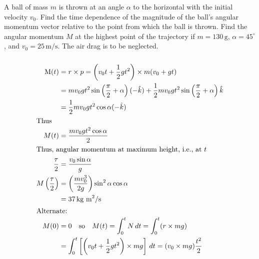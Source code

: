 \item A ball of mass \( m \) is thrown at an angle \( \alpha \) to the horizontal with the initial velocity \( v_0 \). Find the time dependence of the magnitude of the ball's angular momentum vector relative to the point from which the ball is thrown. Find the angular momentum \( M \) at the highest point of the trajectory if \( m = 130 \, \text{g} \), \( \alpha = 45^\circ \), and \( v_0 = 25 \, \text{m/s} \). The air drag is to be neglected.
\begin{solution}
    \begin{center}
    \end{center}
    
    \begin{align*}
        \intertext{}
        \text{M}(t) &= r \times p = \left(v_0 t + \dfrac{1}{2} gt^2 \right) \times m (v_0 + gt) \\
        &= mv_0 gt^2 \sin \left( \dfrac{\pi}{2} + \alpha \right) (-\hat{k}) + \dfrac{1}{2} mv_0 gt^2 \sin \left( \dfrac{\pi}{2} + \alpha \right) \hat{k}\\
        &= \dfrac{1}{2} mv_0 gt^2 \cos \alpha (-\hat{k}) \\
        \intertext{Thus}
        M(t) &= \dfrac{mv_0 gt^2 \cos \alpha}{2} \\
        \intertext{Thus, angular momentum at maximum height, i.e., at $t$}
        \dfrac{\tau}{2} &= \dfrac{v_0 \sin \alpha}{g} \\
        M \left(\dfrac{\tau}{2} \right) &= \left( \dfrac{mv_0^3}{2g} \right) \sin^2 \alpha \cos \alpha \\
        &= 37 \, \text{kg m}^2/\text{s} \\
        \intertext{Alternate:}
        M(0) &= 0 \quad \text{so} \quad M(t) = \int_{0}^{t} N \, dt = \int_{0}^{t} (r \times mg) \\
        &= \int_{0}^{t} \left[ \left( v_0 t + \dfrac{1}{2} gt^2 \right) \times mg \right] \, dt = (v_0 \times mg ) \dfrac{t^2}{2}
    \end{align*}
\end{solution}
